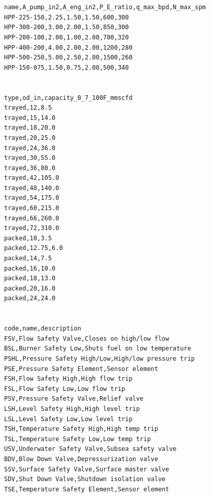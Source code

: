 \documentclass[10pt,a4paper,openany]{book}
\begin{document}
\chapter{}
\begin{lstlisting}[style=plain]
name,A_pump_in2,A_eng_in2,P_E_ratio,q_max_bpd,N_max_spm
HPP-225-150,2.25,1.50,1.50,600,300
HPP-300-200,3.00,2.00,1.50,850,300
HPP-200-100,2.00,1.00,2.00,700,320
HPP-400-200,4.00,2.00,2.00,1200,280
HPP-500-250,5.00,2.50,2.00,1500,260
HPP-150-075,1.50,0.75,2.00,500,340
\end{lstlisting}

\chapter{}
\begin{lstlisting}[style=plain]
type,od_in,capacity_0_7_100F_mmscfd
trayed,12,8.5
trayed,15,14.0
trayed,18,20.0
trayed,20,25.0
trayed,24,36.0
trayed,30,55.0
trayed,36,80.0
trayed,42,105.0
trayed,48,140.0
trayed,54,175.0
trayed,60,215.0
trayed,66,260.0
trayed,72,310.0
packed,10,3.5
packed,12.75,6.0
packed,14,7.5
packed,16,10.0
packed,18,13.0
packed,20,16.0
packed,24,24.0
\end{lstlisting}

\chapter{}
\begin{lstlisting}[style=plain]
code,name,description
FSV,Flow Safety Valve,Closes on high/low flow
BSL,Burner Safety Low,Shuts fuel on low temperature
PSHL,Pressure Safety High/Low,High/low pressure trip
PSE,Pressure Safety Element,Sensor element
FSH,Flow Safety High,High flow trip
FSL,Flow Safety Low,Low flow trip
PSV,Pressure Safety Valve,Relief valve
LSH,Level Safety High,High level trip
LSL,Level Safety Low,Low level trip
TSH,Temperature Safety High,High temp trip
TSL,Temperature Safety Low,Low temp trip
USV,Underwater Safety Valve,Subsea safety valve
BDV,Blow Down Valve,Depressurization valve
SSV,Surface Safety Valve,Surface master valve
SDV,Shut Down Valve,Shutdown isolation valve
TSE,Temperature Safety Element,Sensor element
\end{lstlisting}
\end{document}
